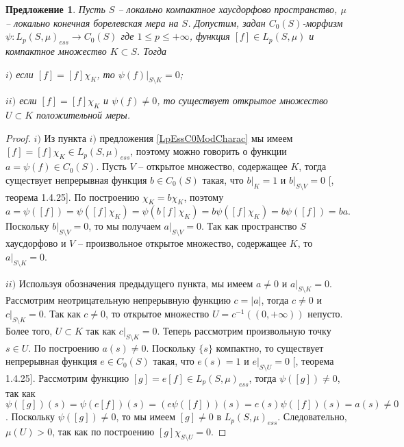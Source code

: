 \documentclass[12pt]{article}
\newtheorem{proposition}[theorem]{Предложение}
\begin{document}
\begin{proposition}\label{MorphLpEssC0Prop} Пусть $S$ -- локально компактное хаусдорфово пространство, $\mu$ -- локально конечная борелевская мера на $S$. Допустим, задан $C_0(S)$-морфизм $\psi:L_p(S,\mu)_{ess}\to C_0(S)$ где $1\leq p\leq+\infty$, функция $[f]\in L_p(S,\mu)$ и компактное множество $K\subset S$. Тогда

    $i)$ если $[f]=[f]\chi_K$, то $\psi(f)|_{S\setminus K}=0$;

    $ii)$ если $[f]=[f]\chi_K$ и $\psi(f)\neq 0$, то существует открытое множество $U\subset K$ положительной меры.
\end{proposition}
\begin{proof} $i)$ Из пункта $i)$ предложения \ref{LpEssC0ModCharac} мы имеем $[f]=[f]\chi_K\in L_p(S,\mu)_{ess}$, поэтому можно говорить о функции $a=\psi(f)\in C_0(S)$. Пусть $V$ -- открытое множество, содержащее $K$, тогда существует непрерывная функция $b\in C_0(S)$ такая, что $b|_K=1$ и $b|_{S\setminus V}=0$ [\cite{DalesBanSpContFunDualSp}, теорема 1.4.25]. По построению $\chi_K=b\chi_K$, поэтому $a=\psi([f])=\psi([f]\chi_K)=\psi(b[f]\chi_K)=b\psi([f]\chi_K)=b\psi([f])=ba$. Поскольку $b|_{S\setminus V}=0$, то мы получаем $a|_{S\setminus V}=0$. Так как пространство $S$ хаусдорфово и $V$ -- произвольное открытое множество, содержащее $K$, то $a|_{S\setminus K}=0$.

    $ii)$ Используя обозначения предыдущего пункта, мы имеем $a\neq 0$ и $a|_{S\setminus K}=0$. Рассмотрим неотрицательную непрерывную функцию $c=|a|$, тогда $c\neq 0$ и $c|_{S\setminus K}=0$. Так как $c\neq 0$, то открытое множество $U=c^{-1}((0, +\infty))$ непусто. Более того, $U\subset K$ так как $c|_{S\setminus K}=0$. Теперь рассмотрим произвольную точку $s\in U$. По построению $a(s)\neq 0$. Поскольку $\{s\}$ компактно, то существует непрерывная функция $e\in C_0(S)$ такая, что $e(s)=1$ и $e|_{S\setminus U}=0$ [\cite{DalesBanSpContFunDualSp}, теорема 1.4.25]. Рассмотрим функцию $[g]=e[f]\in L_p(S,\mu)_{ess}$, тогда $\psi([g])\neq 0$, так как $\psi([g])(s)=\psi(e[f])(s)=(e\psi([f]))(s)=e(s)\psi([f])(s)=a(s)\neq 0$. Поскольку $\psi([g])\neq 0$, то мы имеем $[g]\neq 0$ в $L_p(S,\mu)_{ess}$. Следовательно, $\mu(U)>0$, так как по построению $[g]\chi_{S\setminus U}=0$.
\end{proof}
\end{document}
